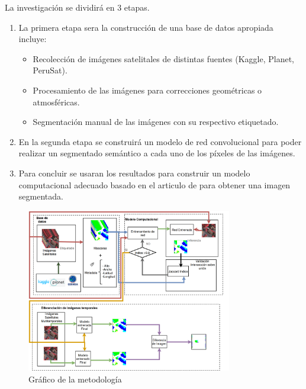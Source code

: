 La investigación se dividirá en 3 etapas. 
\begin{enumerate}
\item La primera etapa sera la construcción de una base de datos apropiada incluye:
\begin{itemize}
 \item Recolección de imágenes satelitales de distintas fuentes (Kaggle, Planet, PeruSat).
 \item Procesamiento de las imágenes para correcciones geométricas o atmosféricas.
 \item Segmentación manual de las imágenes con su respectivo etiquetado. 
\end{itemize}
\item En la segunda etapa se construirá un modelo de red convolucional para poder realizar un segmentado semántico a cada uno de los píxeles de las imágenes.


\item Para concluir se usaran los resultados para construir un modelo computacional adecuado basado en el articulo de \cite{doshi2018satellite} para obtener una imagen segmentada.
\end{enumerate}
\begin{figure}[H]
    \centering
    \includegraphics[width=0.8\textwidth]{images/ArquitecturaFinal.png}
    \caption{Gráfico de la metodología}
    \label{fig:my_label}
\end{figure}
